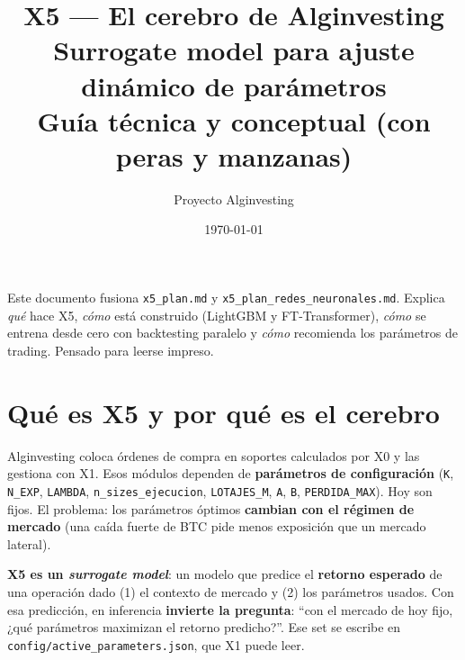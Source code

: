 \documentclass[11pt,a4paper]{article}
\title{\vspace{-1cm}\textbf{X5 — El cerebro de Alginvesting}\\[4pt]
  \large Surrogate model para ajuste dinámico de parámetros\\[2pt]
  \normalsize\color{cgris} Guía técnica y conceptual (con peras y manzanas)}
\author{Proyecto Alginvesting}
\date{\today}
\newcommand{\code}[1]{\texttt{#1}}
\begin{document}
\maketitle
\thispagestyle{empty}

\begin{center}
\begin{minipage}{0.85\textwidth}
\color{cgris}\small
Este documento fusiona \code{x5\_plan.md} y \code{x5\_plan\_redes\_neuronales.md}.
Explica \emph{qué} hace X5, \emph{cómo} está construido (LightGBM y FT-Transformer),
\emph{cómo} se entrena desde cero con backtesting paralelo y \emph{cómo} recomienda los
parámetros de trading. Pensado para leerse impreso.
\end{minipage}
\end{center}

\tableofcontents
\newpage

\section{Qué es X5 y por qué es el cerebro}

Alginvesting coloca órdenes de compra en soportes calculados por X0 y las gestiona con X1.
Esos módulos dependen de \textbf{parámetros de configuración} (\code{K}, \code{N\_EXP},
\code{LAMBDA}, \code{n\_sizes\_ejecucion}, \code{LOTAJES\_M}, \code{A}, \code{B},
\code{PERDIDA\_MAX}). Hoy son fijos. El problema: los parámetros óptimos \textbf{cambian con
el régimen de mercado} (una caída fuerte de BTC pide menos exposición que un mercado lateral).

\textbf{X5 es un \emph{surrogate model}}: un modelo que predice el \textbf{retorno esperado} de
una operación dado (1) el contexto de mercado y (2) los parámetros usados. Con esa predicción,
en inferencia \textbf{invierte la pregunta}: ``con el mercado de hoy fijo, ¿qué parámetros
maximizan el retorno predicho?''. Ese set se escribe en
\code{config/active\_parameters.json}, que X1 puede leer.

\begin{center}
\end{center}
\end{document}
